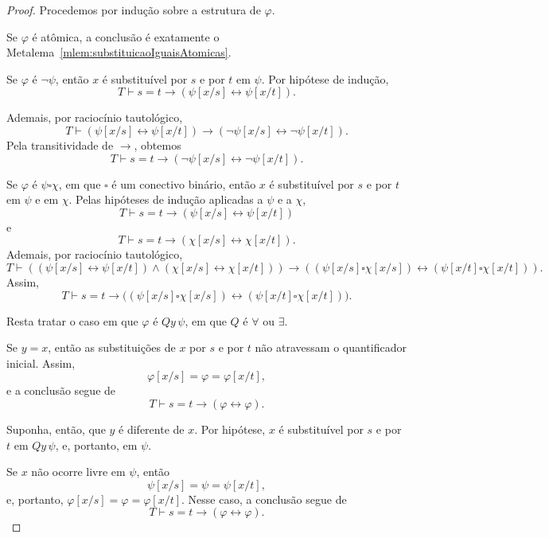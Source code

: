 \begin{proof}
    Procedemos por indução sobre a estrutura de $\varphi$.

    Se $\varphi$ é atômica, a conclusão é exatamente o Metalema~\ref{mlem:substituicaoIguaisAtomicas}.

    Se $\varphi$ é $\neg\psi$, então $x$ é substituível por $s$ e por $t$ em $\psi$.
    Por hipótese de indução,
    \[
        T\vdash s=t\rightarrow(\psi[x/s]\leftrightarrow\psi[x/t]).
    \]
    
    Ademais, por raciocínio tautológico,
    \[
        T\vdash
        (\psi[x/s]\leftrightarrow\psi[x/t])
        \rightarrow
        (\neg\psi[x/s]\leftrightarrow\neg\psi[x/t]).
    \]
    Pela transitividade de $\rightarrow$, obtemos
    \[
        T\vdash s=t\rightarrow(\neg\psi[x/s]\leftrightarrow\neg\psi[x/t]).
    \]

    Se $\varphi$ é $\psi\square\chi$, em que $\square$ é um conectivo binário, então $x$ é substituível por $s$ e por $t$ em $\psi$ e em $\chi$.
    Pelas hipóteses de indução aplicadas a $\psi$ e a $\chi$,
    \[
        T\vdash s=t\rightarrow(\psi[x/s]\leftrightarrow\psi[x/t])
    \]
    e
    \[
        T\vdash s=t\rightarrow(\chi[x/s]\leftrightarrow\chi[x/t]).
    \]
    Ademais, por raciocínio tautológico,
    \[
        T\vdash
        ((\psi[x/s]\leftrightarrow\psi[x/t])\wedge(\chi[x/s]\leftrightarrow\chi[x/t]))
        \rightarrow
        ((\psi[x/s]\square\chi[x/s])\leftrightarrow(\psi[x/t]\square\chi[x/t])).
    \]
    Assim, 
    \[
        T\vdash
        s=t\rightarrow
        \bigl((\psi[x/s]\square\chi[x/s])
        \leftrightarrow
        (\psi[x/t]\square\chi[x/t])\bigr).
    \]
    
    Resta tratar o caso em que $\varphi$ é $Qy\,\psi$, em que $Q$ é $\forall$ ou $\exists$.

    Se $y=x$, então as substituições de $x$ por $s$ e por $t$ não atravessam o quantificador inicial.
    Assim,
    \[
        \varphi[x/s]=\varphi=\varphi[x/t],
    \]
    e a conclusão segue de
    \[
        T\vdash s=t\rightarrow(\varphi\leftrightarrow\varphi).
    \]

    Suponha, então, que $y$ é diferente de $x$.
    Por hipótese, $x$ é substituível por $s$ e por $t$ em $Qy\,\psi$, e, portanto, em $\psi$.

    Se $x$ não ocorre livre em $\psi$, então
    \[
        \psi[x/s]=\psi=\psi[x/t],
    \]
    e, portanto, $\varphi[x/s]=\varphi=\varphi[x/t]$.
    Nesse caso, a conclusão segue de
    \[
        T\vdash s=t\rightarrow(\varphi\leftrightarrow\varphi).
    \]


\end{proof}
